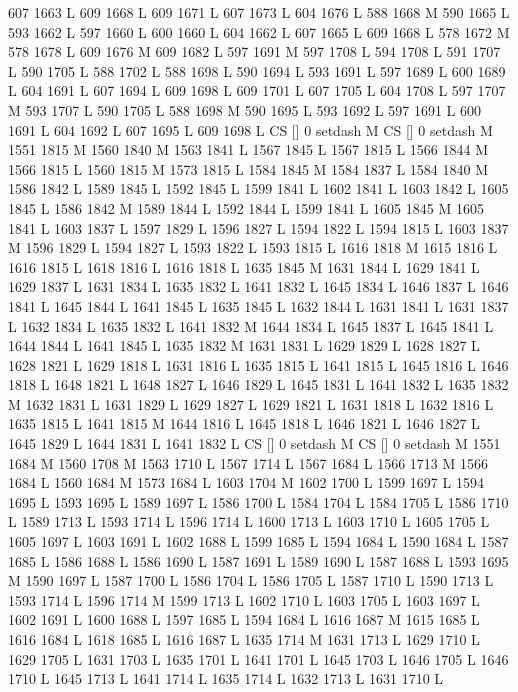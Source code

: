 {{{{{{{{{{{{{{{{{{{{{{{{607 1663 L
609 1668 L
609 1671 L
607 1673 L
604 1676 L
588 1668 M 590 1665 L
593 1662 L
597 1660 L
600 1660 L
604 1662 L
607 1665 L
609 1668 L
578 1672 M 578 1678 L
609 1676 M 609 1682 L
597 1691 M 597 1708 L
594 1708 L
591 1707 L
590 1705 L
588 1702 L
588 1698 L
590 1694 L
593 1691 L
597 1689 L
600 1689 L
604 1691 L
607 1694 L
609 1698 L
609 1701 L
607 1705 L
604 1708 L
597 1707 M 593 1707 L
590 1705 L
588 1698 M 590 1695 L
593 1692 L
597 1691 L
600 1691 L
604 1692 L
607 1695 L
609 1698 L
CS [] 0 setdash M
CS [] 0 setdash M
1551 1815 M 1560 1840 M 1563 1841 L
1567 1845 L
1567 1815 L
1566 1844 M 1566 1815 L
1560 1815 M 1573 1815 L
1584 1845 M 1584 1837 L
1584 1840 M 1586 1842 L
1589 1845 L
1592 1845 L
1599 1841 L
1602 1841 L
1603 1842 L
1605 1845 L
1586 1842 M 1589 1844 L
1592 1844 L
1599 1841 L
1605 1845 M 1605 1841 L
1603 1837 L
1597 1829 L
1596 1827 L
1594 1822 L
1594 1815 L
1603 1837 M 1596 1829 L
1594 1827 L
1593 1822 L
1593 1815 L
1616 1818 M 1615 1816 L
1616 1815 L
1618 1816 L
1616 1818 L
1635 1845 M 1631 1844 L
1629 1841 L
1629 1837 L
1631 1834 L
1635 1832 L
1641 1832 L
1645 1834 L
1646 1837 L
1646 1841 L
1645 1844 L
1641 1845 L
1635 1845 L
1632 1844 L
1631 1841 L
1631 1837 L
1632 1834 L
1635 1832 L
1641 1832 M 1644 1834 L
1645 1837 L
1645 1841 L
1644 1844 L
1641 1845 L
1635 1832 M 1631 1831 L
1629 1829 L
1628 1827 L
1628 1821 L
1629 1818 L
1631 1816 L
1635 1815 L
1641 1815 L
1645 1816 L
1646 1818 L
1648 1821 L
1648 1827 L
1646 1829 L
1645 1831 L
1641 1832 L
1635 1832 M 1632 1831 L
1631 1829 L
1629 1827 L
1629 1821 L
1631 1818 L
1632 1816 L
1635 1815 L
1641 1815 M 1644 1816 L
1645 1818 L
1646 1821 L
1646 1827 L
1645 1829 L
1644 1831 L
1641 1832 L
CS [] 0 setdash M
CS [] 0 setdash M
1551 1684 M 1560 1708 M 1563 1710 L
1567 1714 L
1567 1684 L
1566 1713 M 1566 1684 L
1560 1684 M 1573 1684 L
1603 1704 M 1602 1700 L
1599 1697 L
1594 1695 L
1593 1695 L
1589 1697 L
1586 1700 L
1584 1704 L
1584 1705 L
1586 1710 L
1589 1713 L
1593 1714 L
1596 1714 L
1600 1713 L
1603 1710 L
1605 1705 L
1605 1697 L
1603 1691 L
1602 1688 L
1599 1685 L
1594 1684 L
1590 1684 L
1587 1685 L
1586 1688 L
1586 1690 L
1587 1691 L
1589 1690 L
1587 1688 L
1593 1695 M 1590 1697 L
1587 1700 L
1586 1704 L
1586 1705 L
1587 1710 L
1590 1713 L
1593 1714 L
1596 1714 M 1599 1713 L
1602 1710 L
1603 1705 L
1603 1697 L
1602 1691 L
1600 1688 L
1597 1685 L
1594 1684 L
1616 1687 M 1615 1685 L
1616 1684 L
1618 1685 L
1616 1687 L
1635 1714 M 1631 1713 L
1629 1710 L
1629 1705 L
1631 1703 L
1635 1701 L
1641 1701 L
1645 1703 L
1646 1705 L
1646 1710 L
1645 1713 L
1641 1714 L
1635 1714 L
1632 1713 L
1631 1710 L
}}}}}}}}}}}}}}}}}}}}}}}}
